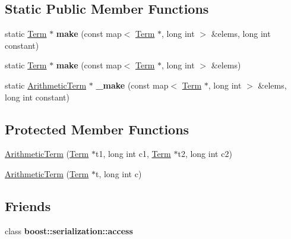 \subsection*{\-Static \-Public \-Member \-Functions}
\begin{DoxyCompactItemize}
\item 
\hypertarget{classArithmeticTerm_abd2187cdd57a25b0a9f58e1d6f795a01}{static \hyperlink{classTerm}{\-Term} $\ast$ {\bfseries make} (const map$<$ \hyperlink{classTerm}{\-Term} $\ast$, long int $>$ \&elems, long int constant)}\label{classArithmeticTerm_abd2187cdd57a25b0a9f58e1d6f795a01}

\item 
\hypertarget{classArithmeticTerm_a60f57b96887a0425eacde9e2fdfe5542}{static \hyperlink{classTerm}{\-Term} $\ast$ {\bfseries make} (const map$<$ \hyperlink{classTerm}{\-Term} $\ast$, long int $>$ \&elems)}\label{classArithmeticTerm_a60f57b96887a0425eacde9e2fdfe5542}

\item 
\hypertarget{classArithmeticTerm_a0c95ebcd917eda048a0e5e339fc4f555}{static \hyperlink{classArithmeticTerm}{\-Arithmetic\-Term} $\ast$ {\bfseries \-\_\-make} (const map$<$ \hyperlink{classTerm}{\-Term} $\ast$, long int $>$ \&elems, long int constant)}\label{classArithmeticTerm_a0c95ebcd917eda048a0e5e339fc4f555}

\end{DoxyCompactItemize}
\subsection*{\-Protected \-Member \-Functions}
\begin{DoxyCompactItemize}
\item 
\hyperlink{classArithmeticTerm_a47f3b4216d85ab30604544fe967450df}{\-Arithmetic\-Term} (\hyperlink{classTerm}{\-Term} $\ast$t1, long int c1, \hyperlink{classTerm}{\-Term} $\ast$t2, long int c2)
\item 
\hyperlink{classArithmeticTerm_a834c32e850aaaf8fc581f54b37c26151}{\-Arithmetic\-Term} (\hyperlink{classTerm}{\-Term} $\ast$t, long int c)
\end{DoxyCompactItemize}
\subsection*{\-Friends}
\begin{DoxyCompactItemize}
\item 
\hypertarget{classArithmeticTerm_ac98d07dd8f7b70e16ccb9a01abf56b9c}{class {\bfseries boost\-::serialization\-::access}}\label{classArithmeticTerm_ac98d07dd8f7b70e16ccb9a01abf56b9c}

\end{DoxyCompactItemize}


